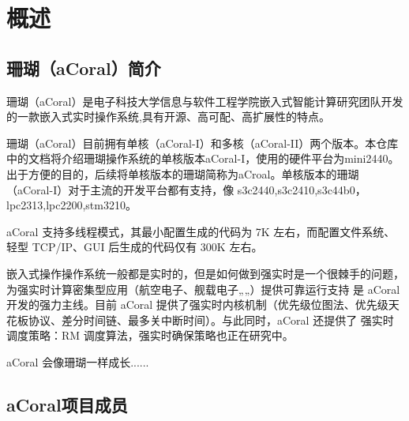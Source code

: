 \chapter{概述}

\section{珊瑚（aCoral）简介}

珊瑚（aCoral）是电子科技大学信息与软件工程学院嵌入式智能计算研究团队开发的一款嵌入式实时操作系统,具有开源、高可配、高扩展性的特点。

珊瑚（aCoral）目前拥有单核（aCoral-I）和多核（aCoral-II）两个版本。本仓库中的文档将介绍珊瑚操作系统的单核版本aCoral-I，使用的硬件平台为mini2440。
出于方便的目的，后续将单核版本的珊瑚简称为aCroal。单核版本的珊瑚（aCoral-I）对于主流的开发平台都有支持，像 s3c2440,s3c2410,s3c44b0，lpc2313,lpc2200,stm3210。

aCoral 支持多线程模式，其最小配置生成的代码为 7K 左右，而配置文件系统、轻型 TCP/IP、GUI 后生成的代码仅有 300K 左右。

嵌入式操作操作系统一般都是实时的，但是如何做到强实时是一个很棘手的问题，为强实时计算密集型应用（航空电子、舰载电子„„）提供可靠运行支持
是 aCoral 开发的强力主线。目前 aCoral 提供了强实时内核机制（优先级位图法、优先级天花板协议、差分时间链、最多关中断时间）。与此同时，aCoral 还提供了
强实时调度策略：RM 调度算法，强实时确保策略也正在研究中。

aCoral 会像珊瑚一样成长......

\section{aCoral项目成员}
